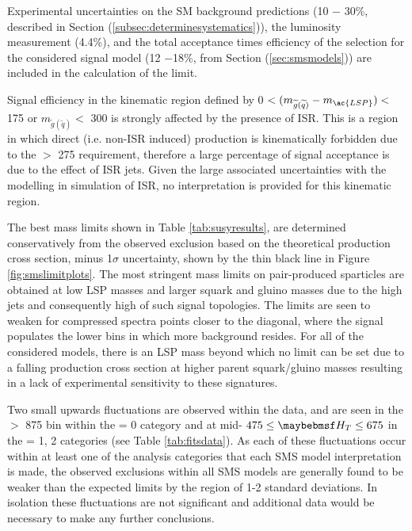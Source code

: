 Experimental uncertainties on the \ac{SM} background predictions (10 $-$ 30\%, described in Section (\ref{subsec:determinesystematics})), the luminosity measurement (4.4\%), and the total acceptance times efficiency of the selection for the considered signal model (12 $-$18\%, from Section (\ref{sec:smsmodels})) are included in the calculation of the limit. 

Signal efficiency in the kinematic region defined by 0 $< (m_{\widetilde{g}(\widetilde{q})} - m_{\ac{LSP}})<$ 175 \GeV or $m_{\widetilde{g}(\widetilde{q})} <$ 300 \GeV is strongly affected by the presence of \acf{ISR}. This is a region in which direct (i.e. non-\ac{ISR} induced) production is kinematically forbidden due to the \theht $>$ 275 \GeV requirement, therefore a large percentage of signal acceptance is due to the effect of \ac{ISR} jets. Given the large associated uncertainties with the modelling in simulation of \ac{ISR}, no interpretation is provided for this kinematic region.

The best mass limits shown in Table  \ref{tab:susyresults}, are determined conservatively from the observed exclusion based on the theoretical production cross section, minus 1$\sigma$ uncertainty, shown by the thin black line in Figure \ref{fig:smslimitplots}. The most stringent mass limits on pair-produced sparticles are obtained at low \ac{LSP} masses and larger squark and gluino masses due to the high \pt jets and consequently high \theht of such signal topologies. The limits are seen to weaken for compressed spectra points closer to the diagonal, where the signal populates the lower \theht bins in which more background resides. For all of the considered models, there is an \ac{LSP} mass beyond which no limit can be set due to a falling production cross section at higher parent squark/gluino masses resulting in a lack of experimental sensitivity to these signatures. 

Two small upwards fluctuations are observed within the data, and are seen in the \theht $>$ 875 \GeV bin within the \nbreco = 0 category and at mid- $475 \leq \theht \leq 675$ in the \nbreco = 1, 2 categories (see Table \ref{tab:fitsdata}). As each of these fluctuations occur within at least one of the analysis categories that each \ac{SMS} model interpretation is made, the observed exclusions within all \ac{SMS} models are generally found to be weaker than the expected limits by the region of 1-2 standard deviations. In isolation these fluctuations are not significant and additional data would be necessary to make any further conclusions.

